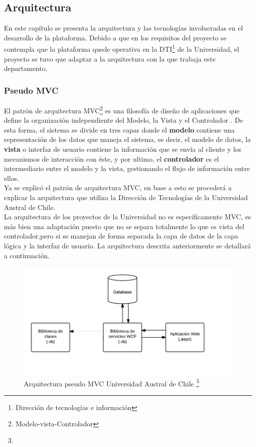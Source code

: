 \subsection{Arquitectura}
 
 En este capítulo se presenta la arquitectura y las tecnologías involucradas en el desarrollo de la plataforma. Debido a que en los requisitos del proyecto se contempla que la plataforma quede operativa en la  DTI\footnote{Dirección de tecnologías e información} de la Universidad, el proyecto se tuvo que adaptar a la arquitectura con la que trabaja este departamento.

\subsubsection{Pseudo MVC }

El patrón de arquitectura MVC\footnote{Modelo-vista-Controlador} es una filosofía de diseño de aplicaciones que define la organización independiente del Modelo, la Vista  y el Controlador \cite{eje15}. De esta forma, el sistema se divide en tres capas donde el \textbf{modelo}  contiene una representación de los datos que maneja el sistema, es decir, el modelo de datos, la \textbf{ vista}  o interfaz de usuario contiene la información que se envía al cliente y los mecanismos de interacción con éste, y por ultimo, el \textbf{controlador} es el intermediario entre el modelo y la vista, gestionando el flujo de información entre ellos.
\\

Ya se explicó el patrón de arquitectura MVC, en base a esto se procederá a explicar la arquitectura que utiliza la Dirección de Tecnologías de la Universidad Austral de Chile.
\\

La arquitectura de los proyectos de la Universidad no es específicamente  MVC, es más bien una adaptación puesto que no se separa totalmente lo que es vista del controlador,pero si se manejan de forma separada la capa de datos de la capa lógica y la interfaz de usuario. La arquitectura descrita anteriormente se detallará a continuación.
\\

	\begin{figure}[H]
		\centering
		\includegraphics[width=1\textwidth]{images/Capitulo_2/pseudoMVC.png}
		\caption[Arquitectura pseudo MVC Universidad Austral de Chile]{Arquitectura pseudo MVC Universidad Austral de Chile \footnote{}}
		\label{FiguraMVC}
	\end{figure}
	
